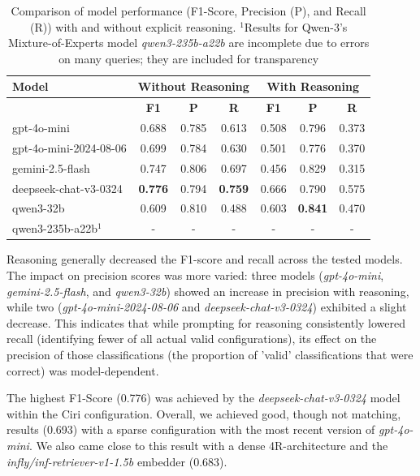 
\begin{table}[h]
    \centering
    \begin{tabular}{|l|c|c|c|c|c|c|}
        \hline
        \textbf{Model} & \multicolumn{3}{c|}{\textbf{Without Reasoning}} & \multicolumn{3}{c|}{\textbf{With Reasoning}} \\
        \hline
        & \textbf{F1} & \textbf{P} & \textbf{R} & \textbf{F1} &  \textbf{P} & \textbf{R} \\
        \hline
        gpt-4o-mini             & 0.688 & 0.785 & 0.613 & 0.508 & 0.796 & 0.373 \\
        gpt-4o-mini-2024-08-06  & 0.699 & 0.784 & 0.630 & 0.501 & 0.776 & 0.370\\
        gemini-2.5-flash        & 0.747 & 0.806 & 0.697 & 0.456 & 0.829 & 0.315 \\
        deepseek-chat-v3-0324   & \textbf{0.776} & 0.794 & \textbf{0.759} & 0.666 & 0.790 & 0.575 \\
        qwen3-32b & 0.609 & 0.810 & 0.488 & 0.603 & \textbf{0.841} & 0.470 \\
        qwen3-235b-a22b$^1$ & - & - & - & - & - & - \\
        \hline
    \end{tabular}
    \caption{Comparison of model performance (F1-Score, Precision (P), and Recall (R)) with and without explicit reasoning. $^1$Results for Qwen-3's Mixture-of-Experts model \textit{qwen3-235b-a22b} are incomplete due to errors on many queries; they are included for transparency}
    \label{tab:model_comparison}
\end{table}

Reasoning generally decreased the F1-score and recall across the tested models. The impact on precision scores was more varied: three models (\textit{gpt-4o-mini}, \textit{gemini-2.5-flash}, and \textit{qwen3-32b}) showed an increase in precision with reasoning, while two (\textit{gpt-4o-mini-2024-08-06} and \textit{deepseek-chat-v3-0324}) exhibited a slight decrease. This indicates that while prompting for reasoning consistently lowered recall (identifying fewer of all actual valid configurations), its effect on the precision of those classifications (the proportion of 'valid' classifications that were correct) was model-dependent.

The highest F1-Score (0.776) was achieved by the \textit{deepseek-chat-v3-0324} model within the Ciri configuration. Overall, we achieved good, though not matching, results (0.693) with a sparse configuration with the most recent version of \textit{gpt-4o-mini}. We also came close to this result with a dense 4R-architecture and the \textit{infly/inf-retriever-v1-1.5b} embedder (0.683). 



